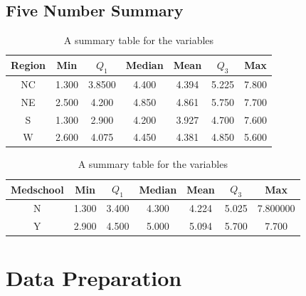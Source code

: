 \documentclass[a4paper,11pt,onecolumn,twoside]{article}
\begin{document}
\subsection{Five Number Summary}
 \begin{table}[H]
	\centering
	\begin{tabular}{ccccccc}
		\midrule[1.5pt]
        Region &Min &$Q_1$ &Median&Mean &$Q_3$ &Max\\
        \hline
       NC   & 1.300       &3.8500     &4.400   &4.394      &5.225   &7.800\\
      NE    &2.500       &4.200     &4.850   &4.861      &5.750  &7.700\\
       S    &1.300       &2.900      &4.200    &3.927       &4.700  &7.600\\
      W    &2.600       &4.075      &4.450   &4.381      &4.850    &5.600\\
        
		\midrule[1.5pt]
	\end{tabular}
	\caption{A summary table for the variables }
\end{table}
 \begin{table}[H]
	\centering
	\begin{tabular}{ccccccc}
		\midrule[1.5pt]
		Medschool &Min &$Q_1$ &Median&Mean &$Q_3$ &Max\\
		\hline
    N    &1.300       &3.400     &4.300  &4.224      &5.025    &7.800000\\
     Y    &2.900     & 4.500    & 5.000    &5.094       &5.700    &7.700\\
		\midrule[1.5pt]
	\end{tabular}
	\caption{A summary table for the variables }
\end{table}

\section{Data Preparation}
\end{document}
